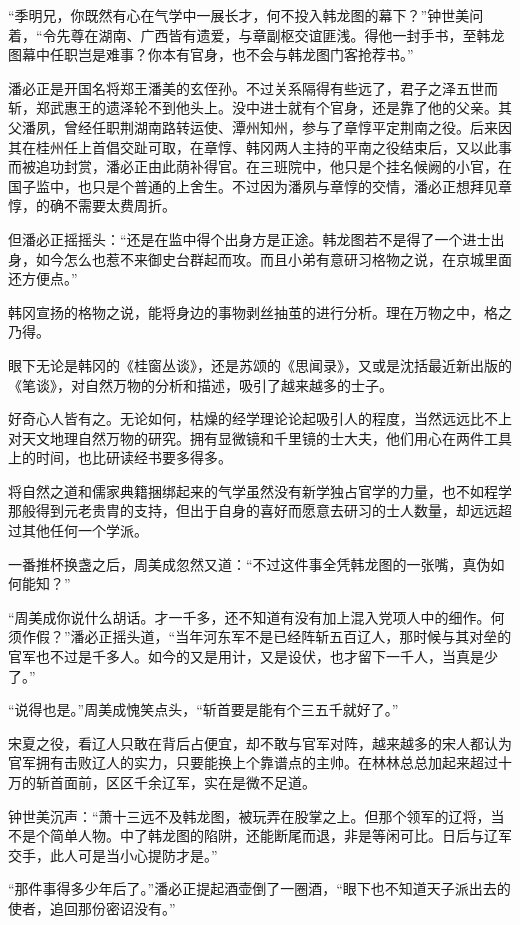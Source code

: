 “季明兄，你既然有心在气学中一展长才，何不投入韩龙图的幕下？”钟世美问着，“令先尊在湖南、广西皆有遗爱，与章副枢交谊匪浅。得他一封手书，至韩龙图幕中任职岂是难事？你本有官身，也不会与韩龙图门客抢荐书。”

潘必正是开国名将郑王潘美的玄侄孙。不过关系隔得有些远了，君子之泽五世而斩，郑武惠王的遗泽轮不到他头上。没中进士就有个官身，还是靠了他的父亲。其父潘夙，曾经任职荆湖南路转运使、潭州知州，参与了章惇平定荆南之役。后来因其在桂州任上首倡交趾可取，在章惇、韩冈两人主持的平南之役结束后，又以此事而被追功封赏，潘必正由此荫补得官。在三班院中，他只是个挂名候阙的小官，在国子监中，也只是个普通的上舍生。不过因为潘夙与章惇的交情，潘必正想拜见章惇，的确不需要太费周折。

但潘必正摇摇头：“还是在监中得个出身方是正途。韩龙图若不是得了一个进士出身，如今怎么也惹不来御史台群起而攻。而且小弟有意研习格物之说，在京城里面还方便点。”

韩冈宣扬的格物之说，能将身边的事物剥丝抽茧的进行分析。理在万物之中，格之乃得。

眼下无论是韩冈的《桂窗丛谈》，还是苏颂的《思闻录》，又或是沈括最近新出版的《笔谈》，对自然万物的分析和描述，吸引了越来越多的士子。

好奇心人皆有之。无论如何，枯燥的经学理论论起吸引人的程度，当然远远比不上对天文地理自然万物的研究。拥有显微镜和千里镜的士大夫，他们用心在两件工具上的时间，也比研读经书要多得多。

将自然之道和儒家典籍捆绑起来的气学虽然没有新学独占官学的力量，也不如程学那般得到元老贵胄的支持，但出于自身的喜好而愿意去研习的士人数量，却远远超过其他任何一个学派。

一番推杯换盏之后，周美成忽然又道：“不过这件事全凭韩龙图的一张嘴，真伪如何能知？”

“周美成你说什么胡话。才一千多，还不知道有没有加上混入党项人中的细作。何须作假？”潘必正摇头道，“当年河东军不是已经阵斩五百辽人，那时候与其对垒的官军也不过是千多人。如今的又是用计，又是设伏，也才留下一千人，当真是少了。”

“说得也是。”周美成愧笑点头，“斩首要是能有个三五千就好了。”

宋夏之役，看辽人只敢在背后占便宜，却不敢与官军对阵，越来越多的宋人都认为官军拥有击败辽人的实力，只要能换上个靠谱点的主帅。在林林总总加起来超过十万的斩首面前，区区千余辽军，实在是微不足道。

钟世美沉声：“萧十三远不及韩龙图，被玩弄在股掌之上。但那个领军的辽将，当不是个简单人物。中了韩龙图的陷阱，还能断尾而退，非是等闲可比。日后与辽军交手，此人可是当小心提防才是。”

“那件事得多少年后了。”潘必正提起酒壶倒了一圈酒，“眼下也不知道天子派出去的使者，追回那份密诏没有。”


